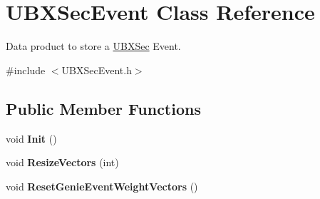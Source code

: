 \hypertarget{classUBXSecEvent}{\section{U\-B\-X\-Sec\-Event Class Reference}
\label{classUBXSecEvent}
}


Data product to store a \hyperlink{classUBXSec}{U\-B\-X\-Sec} Event.  




{\ttfamily \#include $<$U\-B\-X\-Sec\-Event.\-h$>$}

\subsection*{Public Member Functions}
\begin{DoxyCompactItemize}
\item 
\hypertarget{classUBXSecEvent_a57603c847176b408838d04e690b04828}{void {\bfseries Init} ()}\label{classUBXSecEvent_a57603c847176b408838d04e690b04828}

\item 
\hypertarget{classUBXSecEvent_a87228eb442b415053b9a9a070d29790b}{void {\bfseries Resize\-Vectors} (int)}\label{classUBXSecEvent_a87228eb442b415053b9a9a070d29790b}

\item 
\hypertarget{classUBXSecEvent_a41265a7702c054203160d22cc500457e}{void {\bfseries Reset\-Genie\-Event\-Weight\-Vectors} ()}\label{classUBXSecEvent_a41265a7702c054203160d22cc500457e}

\end{DoxyCompactItemize}
